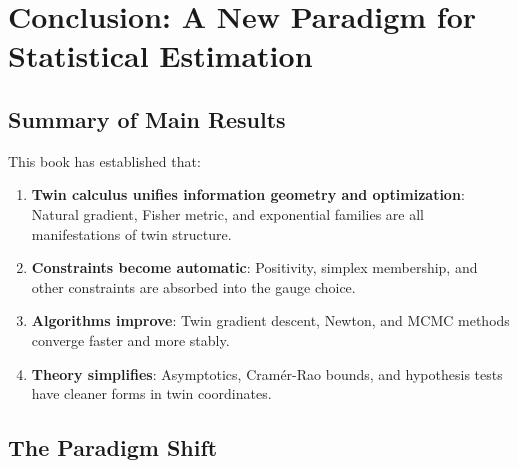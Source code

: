 \documentclass[11pt,twoside]{book}
\theoremstyle{plain}
\theoremstyle{definition}
\theoremstyle{remark}
\begin{document}

\chapter{Conclusion: A New Paradigm for Statistical Estimation}
\label{ch:conclusion}

\section{Summary of Main Results}
\label{sec:summary}

This book has established that:

\begin{enumerate}
    \item \textbf{Twin calculus unifies information geometry and optimization}: Natural gradient, Fisher metric, and exponential families are all manifestations of twin structure.
    
    \item \textbf{Constraints become automatic}: Positivity, simplex membership, and other constraints are absorbed into the gauge choice.
    
    \item \textbf{Algorithms improve}: Twin gradient descent, Newton, and MCMC methods converge faster and more stably.
    
    \item \textbf{Theory simplifies}: Asymptotics, Cramér-Rao bounds, and hypothesis tests have cleaner forms in twin coordinates.
\end{enumerate}

\section{The Paradigm Shift}
\label{sec:paradigm}

\begin{center}
\end{center}
\end{document}
